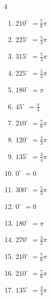 \begin{multicols}{4}
\begin{enumerate}
  \item $\displaystyle 210^{\circ}$
        $\displaystyle =\frac{7}{6}\pi$

  \item $\displaystyle 225^{\circ}$
        $\displaystyle =\frac{5}{4}\pi$

  \item $\displaystyle 315^{\circ}$
        $\displaystyle =\frac{7}{4}\pi$

  \item $\displaystyle 225^{\circ}$
        $\displaystyle =\frac{5}{4}\pi$

  \item $\displaystyle 180^{\circ}$
        $\displaystyle =\pi$

\columnbreak %

  \item $\displaystyle 45^{\circ}$
        $\displaystyle =\frac{\pi}{4}$

  \item $\displaystyle 210^{\circ}$
        $\displaystyle =\frac{7}{6}\pi$

  \item $\displaystyle 120^{\circ}$
        $\displaystyle =\frac{2}{3}\pi$

  \item $\displaystyle 135^{\circ}$
        $\displaystyle =\frac{3}{4}\pi$

  \item $\displaystyle 0^{\circ}$
        $\displaystyle =0$

  \item $\displaystyle 300^{\circ}$
        $\displaystyle =\frac{5}{3}\pi$

  \item $\displaystyle 0^{\circ}$
        $\displaystyle =0$

  \item $\displaystyle 180^{\circ}$
        $\displaystyle =\pi$

  \item $\displaystyle 270^{\circ}$
        $\displaystyle =\frac{3}{2}\pi$

  \item $\displaystyle 210^{\circ}$
        $\displaystyle =\frac{7}{6}\pi$

  \item $\displaystyle 210^{\circ}$
        $\displaystyle =\frac{7}{6}\pi$

  \item $\displaystyle 135^{\circ}$
        $\displaystyle =\frac{3}{4}\pi$


\end{enumerate}
\end{multicols}
